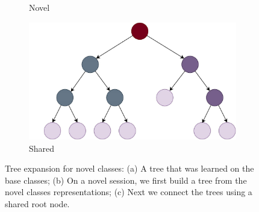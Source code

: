 \documentclass[preprint,11pt]{elsarticle}
\begin{document}
\begin{figure}
\begin{subfigure}[b]{0.25\textwidth}
                \caption{Novel}
                \label{fig:imageb2}
            \end{subfigure}
            \hfill
            \begin{subfigure}[b]{0.4\textwidth}
                \centering
                \includegraphics[width=\textwidth]{images/achituve21c3.jpg}
                \caption{Shared}
                \label{fig:imagec2}
            \end{subfigure}
            \caption{Tree expansion for novel classes: (a) A tree that was
            learned on the base classes; (b) On a novel session, we first build a
            tree from the novel classes representations; (c) Next we connect
            the trees using a shared root node.}
            \label{fig:fig2}
        \end{figure}
\end{document}
